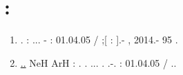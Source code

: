 \documentclass[a4paper]{article}
\newcommand\liststyleWWNumi{%
\renewcommand\theenumi{\arabic{enumi}}
\renewcommand\theenumii{\Roman{enumii}}
\renewcommand\theenumiii{\roman{enumiii}}
\renewcommand\theenumiv{\arabic{enumiv}}
\renewcommand\labelenumi{\theenumi.}
\renewcommand\labelenumii{\theenumii.}
\renewcommand\labelenumiii{\theenumiii.}
\renewcommand\labelenumiv{\theenumiv.}
}
\begin{document}
\bigskip

\clearpage\section[{\CYRS}{\cyrp}{\cyri}{\cyrs}{\cyro}{\cyrk}
{\cyrl}{\cyri}{\cyrt}{\cyre}{\cyrr}{\cyra}{\cyrt}{\cyru}{\cyrr}{\cyrery}:]{{\CYRS}{\cyrp}{\cyri}{\cyrs}{\cyro}{\cyrk}
{\cyrl}{\cyri}{\cyrt}{\cyre}{\cyrr}{\cyra}{\cyrt}{\cyru}{\cyrr}{\cyrery}:}
\hypertarget{RefHeading4709463868395}{}\liststyleWWNumi
\begin{enumerate}
\item {\CYRE}{\cyrl}{\cyrf}{\cyri}{\cyrm}{\cyro}{\cyrv} {\CYRS}{\cyre}{\cyrr}{\cyrg}{\cyre}{\cyrishrt}
{\CYRV}{\cyri}{\cyrk}{\cyrt}{\cyro}{\cyrr}{\cyro}{\cyrv}{\cyri}{\cyrch}.
{\CYRM}{\cyrn}{\cyro}{\cyrg}{\cyro}{\cyrk}{\cyra}{\cyrn}{\cyra}{\cyrl}{\cyrsftsn}{\cyrn}{\cyra}{\cyrya}
{\cyrt}{\cyre}{\cyro}{\cyrr}{\cyri}{\cyrya} {\cyrk}{\cyrv}{\cyra}{\cyrn}{\cyrt}{\cyro}{\cyrv}{\cyro}{\cyrg}{\cyro}
{\cyrd}{\cyre}{\cyrf}{\cyre}{\cyrk}{\cyrt}{\cyra} {\cyrd}{\cyrl}{\cyrya}
{\cyrp}{\cyro}{\cyrl}{\cyrya}{\cyrr}{\cyrn}{\cyrery}{\cyrh} {\cyrm}{\cyro}{\cyrl}{\cyre}{\cyrk}{\cyru}{\cyrl}:
{\cyrd}{\cyri}{\cyrs}{\cyrs}{\cyre}{\cyrr}{\cyrt}{\cyra}{\cyrc}{\cyri}{\cyrya} ...
{\cyrk}{\cyra}{\cyrn}{\cyrd}{\cyri}{\cyrd}{\cyra}{\cyrt}{\cyra}
{\cyrf}{\cyri}{\cyrz}{\cyri}{\cyrk}{\cyro}-{\cyrm}{\cyra}{\cyrt}{\cyre}{\cyrm}{\cyra}{\cyrt}{\cyri}{\cyrch}{\cyre}{\cyrs}{\cyrk}{\cyri}{\cyrh}
{\cyrn}{\cyra}{\cyru}{\cyrk}: 01.04.05 / {\CYRE}{\cyrl}{\cyrf}{\cyri}{\cyrm}{\cyro}{\cyrv}
{\CYRS}{\cyre}{\cyrr}{\cyrg}{\cyre}{\cyrishrt}
{\CYRV}{\cyri}{\cyrk}{\cyrt}{\cyro}{\cyrr}{\cyro}{\cyrv}{\cyri}{\cyrch};[{\CYRM}{\cyre}{\cyrs}{\cyrt}{\cyro}
{\cyrz}{\cyra}{\cyrshch}{\cyri}{\cyrt}{\cyrery}:
{\CYRV}{\cyro}{\cyrr}{\cyro}{\cyrn}{\cyre}{\cyrzh}{\cyrs}{\cyrk}{\cyri}{\cyrishrt}
{\cyrg}{\cyro}{\cyrs}{\cyru}{\cyrd}{\cyra}{\cyrr}{\cyrs}{\cyrt}{\cyrv}{\cyre}{\cyrn}{\cyrn}{\cyrery}{\cyrishrt}
{\cyru}{\cyrn}{\cyri}{\cyrv}{\cyre}{\cyrr}{\cyrs}{\cyri}{\cyrt}{\cyre}{\cyrt}].-
{\CYRV}{\cyro}{\cyrr}{\cyro}{\cyrn}{\cyre}{\cyrzh}, 2014.- 95 {\cyrs}. 
\item
\href{http://xn--90ax2c.xn--p1ai/search/?f_field%5bauthorbook%5d=f/authorbook/%D0%B0%D0%BB%D1%87%D0%B5%D0%B5%D0%B2+%D0%BF.%D0%B3.}{{\CYRA}{\cyrl}{\cyrch}{\cyre}{\cyre}{\cyrv} {\CYRP}.{\CYRG}.} {\CYRS}{\cyri}{\cyrl}{\cyrery} {\cyro}{\cyrs}{\cyrc}{\cyri}{\cyrl}{\cyrl}{\cyrya}{\cyrt}{\cyro}{\cyrr}{\cyro}{\cyrv} {\cyrerev}{\cyrl}{\cyre}{\cyrk}{\cyrt}{\cyrr}{\cyro}{\cyrn}{\cyrn}{\cyrery}{\cyrh} {\cyrp}{\cyre}{\cyrr}{\cyre}{\cyrh}{\cyro}{\cyrd}{\cyro}{\cyrv} {\cyrm}{\cyre}{\cyrzh}{\cyrd}{\cyru} {\cyrr}{\cyri}{\cyrd}{\cyrb}{\cyre}{\cyrr}{\cyrg}{\cyro}{\cyrv}{\cyrs}{\cyrk}{\cyri}{\cyrm}{\cyri} {\cyrs}{\cyro}{\cyrs}{\cyrt}{\cyro}{\cyrya}{\cyrn}{\cyri}{\cyrya}{\cyrm}{\cyri} {\cyrerev}{\cyrk}{\cyrs}{\cyri}{\cyrm}{\cyre}{\cyrr}{\cyrn}{\cyrery}{\cyrh} {\cyrm}{\cyro}{\cyrl}{\cyre}{\cyrk}{\cyru}{\cyrl} NeH {\cyri} ArH : {\cyra}{\cyrv}{\cyrt}{\cyro}{\cyrr}{\cyre}{\cyrf}. {\cyrd}{\cyri}{\cyrs}. ... {\cyrk}{\cyra}{\cyrn}{\cyrd}. {\cyrf}{\cyri}{\cyrz}.-{\cyrm}{\cyra}{\cyrt}. {\cyrn}{\cyra}{\cyru}{\cyrk} : 01.04.05 / {\CYRP}.{\CYRG}. {\CYRA}{\cyrl}{\cyrch}{\cyre}{\cyre}{\cyrv}

\end{enumerate}
\end{document}
